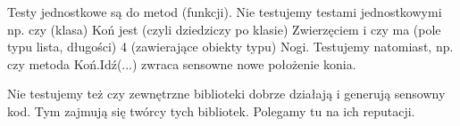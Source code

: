 \documentclass[10pt]{article}
\begin{document}
Testy jednostkowe są do metod (funkcji). Nie testujemy testami jednostkowymi np. czy (klasa) Koń jest (czyli dziedziczy po klasie) Zwierzęciem i czy ma (pole typu lista, długości) 4 (zawierające obiekty typu) Nogi. Testujemy natomiast, np. czy metoda Koń.Idź(...) zwraca sensowne nowe położenie konia.

Nie testujemy też czy zewnętrzne biblioteki dobrze działają i generują sensowny kod. Tym zajmują się twórcy tych bibliotek. Polegamy tu na ich reputacji.
\end{document}
